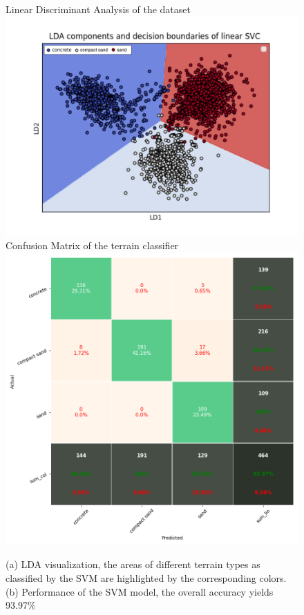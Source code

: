 \begin{figure}[!htb]
    \centering
    \subcaptionbox
        {Linear Discriminant Analysis of the dataset}
        {\includegraphics[width=\columnwidth]{../figures/boundary_LDA_prevTesting_all_sand_concrete_compactsand.png}}
    \subcaptionbox
        {Confusion Matrix of the terrain classifier}
        {\includegraphics[width=\columnwidth]{../figures/confusionmatrix_Train.png}}
    \caption{(a) LDA visualization, the areas of different terrain types as classified by the SVM are highlighted by the corresponding colors. (b) Performance of the SVM model, the overall accuracy yields 93.97\% }
    \label{fig:offline-class}
\end{figure}

